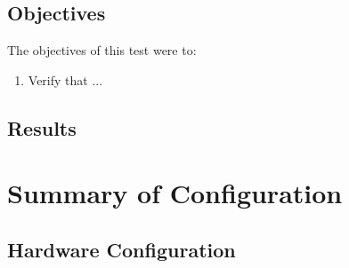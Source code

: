 \documentclass[TR]{spherex}
\begin{document}

\subsection{Objectives}

The objectives of this test were to:

\begin{enumerate}
  \item Verify that ...
\end{enumerate}


\subsection{Results}





\section{Summary of Configuration} %

\subsection{Hardware Configuration}
\end{document}
